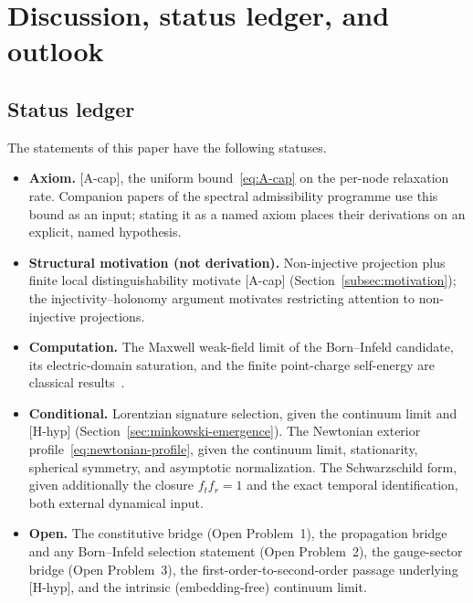 \documentclass[epj]{svjour}
\begin{document}
  \section{Discussion, status ledger, and outlook}
  \label{sec:discussion-and-conclusion}

  \subsection{Status ledger}
    \label{subsec:status-ledger}

    The statements of this paper have the following statuses.

    \begin{itemize}
      \item \textbf{Axiom.}
      [A-cap], the uniform bound~\eqref{eq:A-cap} on the per-node relaxation rate.
      Companion papers of the spectral admissibility programme use this bound as an input; stating
      it as a named axiom places their derivations on an explicit, named hypothesis.

      \item \textbf{Structural motivation (not derivation).}
      Non-injective projection plus finite local distinguishability motivate [A-cap]
      (Section~\ref{subsec:motivation}); the injectivity--holonomy argument motivates restricting
      attention to non-injective projections.

      \item \textbf{Computation.}
      The Maxwell weak-field limit of the Born--Infeld candidate, its electric-domain saturation,
      and the finite point-charge self-energy are classical
      results~\cite{BornInfeld,Gibbons1998}.

      \item \textbf{Conditional.}
      Lorentzian signature selection, given the continuum limit and [H-hyp]
      (Section~\ref{sec:minkowski-emergence}).
      The Newtonian exterior profile~\eqref{eq:newtonian-profile}, given the continuum limit,
      stationarity, spherical symmetry, and asymptotic normalization.
      The Schwarzschild form, given additionally the closure $f_t f_r = 1$ and the exact temporal
      identification, both external dynamical input.

      \item \textbf{Open.}
      The constitutive bridge (Open Problem~1), the propagation bridge and any Born--Infeld
      selection statement (Open Problem~2), the gauge-sector bridge (Open Problem~3), the
      first-order-to-second-order passage underlying [H-hyp], and the intrinsic (embedding-free)
      continuum limit.
    \end{itemize}
\end{document}
